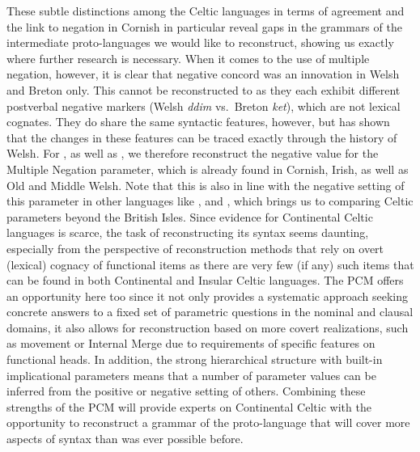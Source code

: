 \documentclass[output=paper,colorlinks,citecolor=brown]{langscibook}
\begin{document}
\largerpage
\noindent These subtle distinctions among the Celtic languages in terms of agreement and the link to negation in Cornish in particular reveal gaps in the grammars of the intermediate proto-languages we would like to reconstruct, showing us exactly where further research is necessary. When it comes to the use of multiple negation, however, it is clear that negative concord was an innovation in Welsh and Breton only. This cannot be reconstructed to  as they each exhibit different postverbal negative markers (Welsh \textit{ddim} vs.\ Breton \textit{ket}), which are not lexical cognates. They do share the same syntactic features, however, but \citet{mm:willis_negation_2006} has shown that the changes in these features can be traced exactly through the history of Welsh. For , as well as , we therefore reconstruct the negative value for the Multiple Negation parameter, which is already found in Cornish, Irish, as well as Old and Middle Welsh. Note that this is also in line with the negative setting of this parameter in other  languages like ,  and , which brings us to comparing Celtic parameters beyond the British Isles. Since evidence for Continental Celtic languages is scarce, the task of reconstructing its syntax seems daunting, especially from the perspective of reconstruction methods that rely on overt (lexical) cognacy of functional items as there are very few (if any) such items that can be found in both Continental and Insular Celtic languages. The PCM offers an opportunity here too since it not only provides a systematic approach seeking concrete answers to a fixed set of parametric questions in the nominal and clausal domains, it also allows for reconstruction based on more covert realizations, such as movement or Internal Merge due to requirements of specific features on functional heads. In addition, the strong hierarchical structure with built-in implicational parameters means that a number of parameter values can be inferred from the positive or negative setting of others. Combining these strengths of the PCM will provide experts on Continental Celtic with the opportunity to reconstruct a grammar of the proto-language that will cover more aspects of syntax than was ever possible before.
\end{document}
